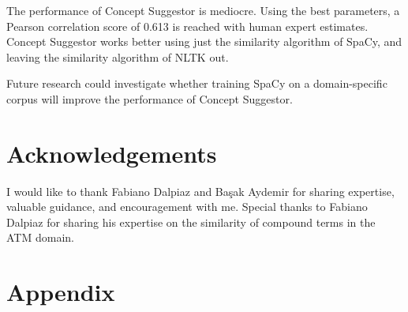 \documentclass{article}
\begin{document}
The performance of Concept Suggestor is mediocre. Using the best parameters, a Pearson correlation score of 0.613 is reached with human expert estimates. Concept Suggestor works better using just the similarity algorithm of SpaCy, and leaving the similarity algorithm of NLTK out.

Future research could investigate whether training SpaCy on a domain-specific corpus will improve the performance of Concept Suggestor.

\section{Acknowledgements} \label{sec:ack}

I would like to thank Fabiano Dalpiaz and Ba\c sak Aydemir for sharing expertise, valuable guidance, and encouragement with me. Special thanks to Fabiano Dalpiaz for sharing his expertise on the similarity of compound terms in the ATM domain.

\printbibliography

\section{Appendix}
\end{document}
